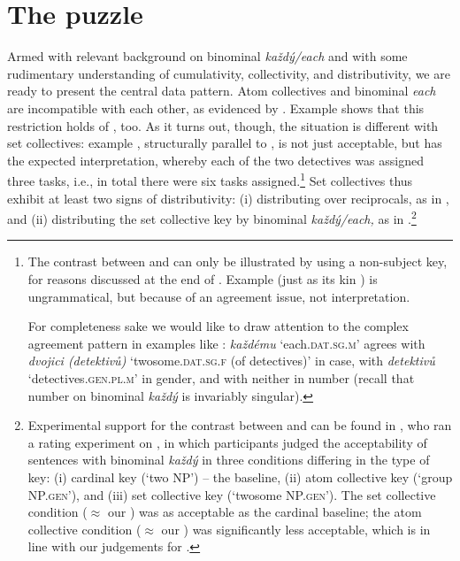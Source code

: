 \documentclass[output=paper,colorlinks,citecolor=brown,newtxmath]{langscibook}
\begin{document}

\section{The puzzle}\label{s:puzzle}

\largerpage
Armed with relevant background on binominal \textit{každý/each} and with some rudimentary understanding of cumulativity, collectivity, and distributivity, we are ready to present the central data pattern. Atom collectives and binominal \textit{each} are incompatible with each other, as evidenced by . Example  shows that this restriction holds of , too. As it turns out, though, the situation is different with set collectives: example , structurally parallel to , is not just acceptable, but has the expected interpretation, whereby each of the two detectives was assigned three tasks, i.e., in total there were six tasks assigned.\footnote{The contrast between  and  can only be illustrated by using a non-subject key, for reasons discussed at the end of . Example  (just as its kin ) is ungrammatical, but because of an agreement issue, not interpretation.

\label{ex:coll.num.subj}
\z

\noindent For completeness sake we would like to draw attention to the complex agreement pattern in examples like : \textit{každému} `each.\textsc{dat.sg.m}' agrees with \textit{dvojici (detektivů)} `twosome.\textsc{dat.sg.f} (of detectives)' in case, with \textit{detektivů} `detectives.\textsc{gen.pl.m}' in gender, and with neither in number (recall that number on binominal \textit{každý} is invariably singular).} Set collectives thus exhibit at least two signs of distributivity: (i) distributing over reciprocals, as in , and (ii) distributing the set collective key by binominal \textit{každý/each,} as in .\footnote{Experimental support for the contrast between  and  can be found in \cite{Kuruncziova2020thesis}, who ran a rating experiment on , in which participants judged the acceptability of sentences with binominal \textit{každý} in three conditions differing in the type of key: (i) cardinal key (`two NP') -- the baseline, (ii) atom collective key (`group NP.\textsc{gen}'), and (iii) set collective key (`twosome NP.\textsc{gen}'). The set collective condition ($\approx$ our ) was as acceptable as the cardinal baseline; the atom collective condition ($\approx$ our ) was significantly less acceptable, which is in line with our judgements for .}
\end{document}
